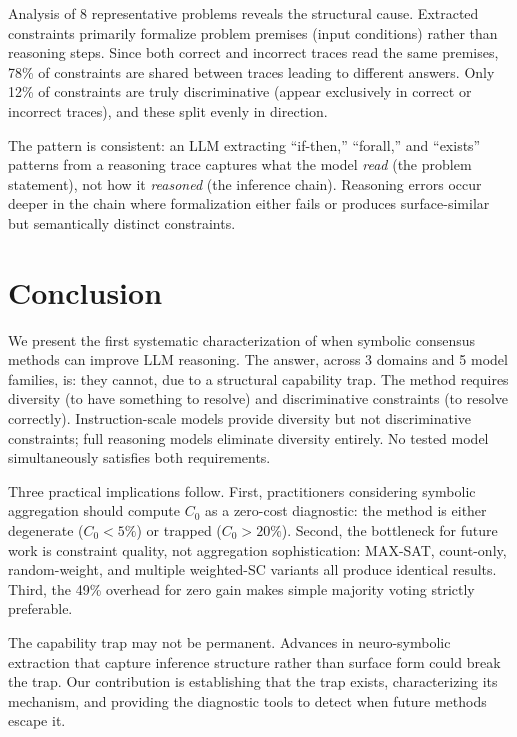 \documentclass[11pt,a4paper]{article}
\begin{document}
Analysis of 8 representative problems reveals the structural cause. Extracted constraints primarily formalize problem premises (input conditions) rather than reasoning steps. Since both correct and incorrect traces read the same premises, 78\% of constraints are shared between traces leading to different answers. Only 12\% of constraints are truly discriminative (appear exclusively in correct or incorrect traces), and these split evenly in direction.

The pattern is consistent: an LLM extracting ``if-then,'' ``forall,'' and ``exists'' patterns from a reasoning trace captures what the model \emph{read} (the problem statement), not how it \emph{reasoned} (the inference chain). Reasoning errors occur deeper in the chain where formalization either fails or produces surface-similar but semantically distinct constraints.

\section{Conclusion}

We present the first systematic characterization of when symbolic consensus methods can improve LLM reasoning. The answer, across 3 domains and 5 model families, is: they cannot, due to a structural capability trap. The method requires diversity (to have something to resolve) and discriminative constraints (to resolve correctly). Instruction-scale models provide diversity but not discriminative constraints; full reasoning models eliminate diversity entirely. No tested model simultaneously satisfies both requirements.

Three practical implications follow. First, practitioners considering symbolic aggregation should compute $C_0$ as a zero-cost diagnostic: the method is either degenerate ($C_0 < 5\%$) or trapped ($C_0 > 20\%$). Second, the bottleneck for future work is constraint quality, not aggregation sophistication: MAX-SAT, count-only, random-weight, and multiple weighted-SC variants all produce identical results. Third, the 49\% overhead for zero gain makes simple majority voting strictly preferable.

The capability trap may not be permanent. Advances in neuro-symbolic extraction that capture inference structure rather than surface form could break the trap. Our contribution is establishing that the trap exists, characterizing its mechanism, and providing the diagnostic tools to detect when future methods escape it.
\end{document}
